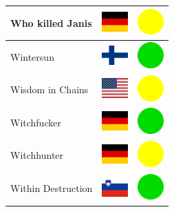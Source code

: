 \documentclass[12pt, a4paper, twoside]{report}
\begin{document}
\begin{center}
\begin{longtable}{|p{5cm}|p{2cm}|p{2cm}|}
Who killed Janis & \includegraphics[width=1cm]{4x3/de} & \includegraphics[width=1cm]{likes/m} \\ \hline
Wintersun & \includegraphics[width=1cm]{4x3/fi} & \includegraphics[width=1cm]{likes/y} \\ \hline
Wisdom in Chains & \includegraphics[width=1cm]{4x3/us} & \includegraphics[width=1cm]{likes/m} \\ \hline
Witchfucker & \includegraphics[width=1cm]{4x3/de} & \includegraphics[width=1cm]{likes/y} \\ \hline
Witchhunter & \includegraphics[width=1cm]{4x3/de} & \includegraphics[width=1cm]{likes/m} \\ \hline
Within Destruction & \includegraphics[width=1cm]{4x3/si} & \includegraphics[width=1cm]{likes/y} \\ \hline

\end{longtable}
\end{center}
\end{document}
